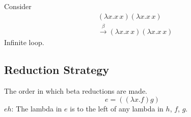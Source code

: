 \documentclass[]{article}
\begin{document}
Consider 
\begin{align*}
&(\lambda x.x\,x)(\lambda x.x\,x)\\
&\overset{\beta}{\rightarrow}(\lambda x.x\,x)(\lambda x.x\,x)
\end{align*}
Infinite loop.

\subsection*{Reduction Strategy}
The order in which beta reductions are made.
\[ e = ((\lambda x.f)g) \]
$eh$: The lambda in $e$ is to the left of any lambda in $h$, $f$, $g$.
\end{document}
